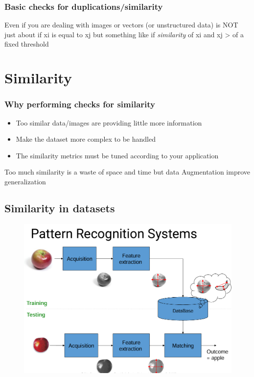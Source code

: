 \subsubsection{Basic checks for duplications/similarity}
\noindent Even if you are dealing with images or vectors (or unstructured data) is NOT just about if xi is equal to xj but something like if \textit{similarity} of xi and xj > of a fixed threshold


\section{Similarity }

\subsubsection{Why performing checks for similarity}
\begin{itemize}
    \item Too similar data/images are providing little more information
    \item Make the dataset more complex to be handled
    \item The similarity metrics must be tuned according to your application
\end{itemize}

\noindent Too much similarity is a waste of space and time but data Augmentation improve generalization 

\subsection{Similarity in datasets}
\begin{figure}[H]
    \centering
    \includegraphics[width=0.8\linewidth]{09-10/images/pattern recognition.png}
\end{figure}

